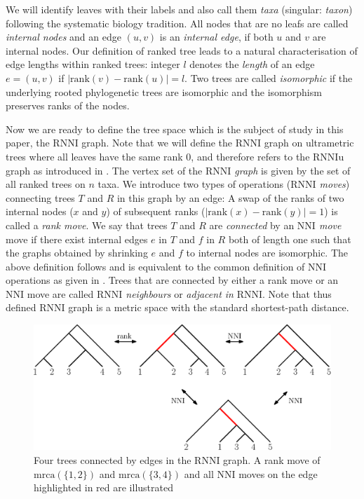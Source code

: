 \documentclass{amsart}
\newcommand{\mrca}{\mathrm{mrca}}
\newcommand{\rank}{\mathrm{rank}}
\newcommand{\nni}{\mathrm{NNI}}
\newcommand{\rnni}{\mathrm{RNNI}}
\newcommand{\rnniu}{\mathrm{RNNIu}}
\begin{document}
We will identify leaves with their labels and also call them \emph{taxa} (singular: \emph{taxon}) following the systematic biology tradition.
All nodes that are no leafs are called \emph{internal nodes} and an edge $(u,v)$ is an \emph{internal edge}, if both $u$ and $v$ are internal nodes.
Our definition of ranked tree leads to a natural characterisation of edge lengths within ranked trees:
integer $l$ denotes the \emph{length} of an edge $e=(u,v)$ if $|\rank(v) - \rank(u)| = l$.
Two trees are called \emph{isomorphic} if the underlying rooted phylogenetic trees are isomorphic and the isomorphism preserves ranks of the nodes.

Now we are ready to define the tree space which is the subject of study in this paper, the $\rnni$ graph.
Note that we will define the $\rnni$ graph on ultrametric trees where all leaves have the same rank $0$, and therefore refers to the $\rnniu$ graph as introduced in \autocite{Gavryushkin2018-ol}.
The vertex set of the \emph{$\rnni$ graph} is given by the set of all ranked trees on $n$ taxa.
We introduce two types of operations (\emph{$\rnni$ moves}) connecting trees $T$ and $R$ in this graph by an edge:
A swap of the ranks of two internal nodes ($x$ and $y$) of subsequent ranks ($|\rank(x) - \rank(y)| = 1$) is called a \emph{rank move}.
We say that trees $T$ and $R$ are \emph{connected} by an \emph{$\nni$ move} move if there exist internal edges $e$ in $T$ and $f$ in $R$ both of length one such that the graphs obtained by shrinking $e$ and $f$ to internal nodes are isomorphic.
The above definition follows \autocite{Gavryushkin2018-ol} and is equivalent to the common definition of $\nni$ operations as given in \autocite{Steel2016-ye}.
Trees that are connected by either a rank move or an $\nni$ move are called \emph{$\rnni$ neighbours} or \emph{adjacent in} $\rnni$.
Note that thus defined $\rnni$ graph is a metric space with the standard shortest-path distance.

\begin{figure}[H]
	\centering
	\includegraphics[width=\textwidth]{RNNI}
	\caption{Four trees connected by edges in the $\rnni$ graph. A rank move of $\mrca(\{1,2\})$ and $\mrca(\{3,4\})$ and all $\nni$ moves on the edge highlighted in red are illustrated}
	\label{fig:RNNI}
\end{figure}
\end{document}
